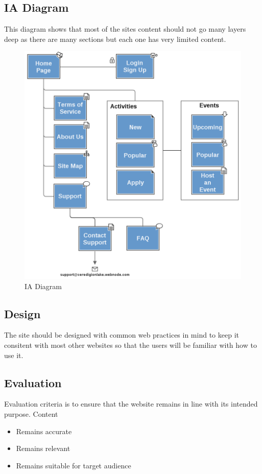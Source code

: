 \documentclass{article}
\begin{document}
\subsection{IA Diagram}
This diagram shows that most of the sites content should not go many layers deep as there are many sections but each one has very limited content.
\begin{figure}[h]
\centering
        \includegraphics[width=5.0in] {IA.png}
        \caption{IA Diagram}
        \label{IA Diagram}
\end{figure}

\subsection{Design}
The site should be designed with common web practices in mind to keep it consitent with most other websites so that the users will be familiar with how to use it.

\subsection{Evaluation}
Evaluation criteria is to ensure that the website remains in line with its intended purpose.
Content
\begin{itemize}
\item Remains accurate
\item Remains relevant
\item Remains suitable for target audience
\end{itemize}
\end{document}
